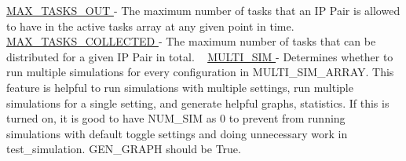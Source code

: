 \hyperlink{namespacedynamicfilterapp_1_1toggles_a27cea6b210bbcb9af3fbd7edc3901390}{M\+A\+X\+\_\+\+T\+A\+S\+K\+S\+\_\+\+O\+UT } -\/ The maximum number of tasks that an IP Pair is allowed to have in the active tasks array at any given point in time. ~\newline
 \hyperlink{namespacedynamicfilterapp_1_1toggles_aa05c90c0672e9b74717bdeabb00fd1bb}{M\+A\+X\+\_\+\+T\+A\+S\+K\+S\+\_\+\+C\+O\+L\+L\+E\+C\+T\+ED } -\/ The maximum number of tasks that can be distributed for a given IP Pair in total. ~\newline
 \hyperlink{namespacedynamicfilterapp_1_1toggles_a8822be27c516d0f027cff60d067b6d87}{M\+U\+L\+T\+I\+\_\+\+S\+IM } -\/ Determines whether to run multiple simulations for every configuration in M\+U\+L\+T\+I\+\_\+\+S\+I\+M\+\_\+\+A\+R\+R\+AY. This feature is helpful to run simulations with multiple settings, run multiple simulations for a single setting, and generate helpful graphs, statistics. If this is turned on, it is good to have N\+U\+M\+\_\+\+S\+IM as 0 to prevent from running simulations with default toggle settings and doing unnecessary work in test\+\_\+simulation. G\+E\+N\+\_\+\+G\+R\+A\+PH should be True.
